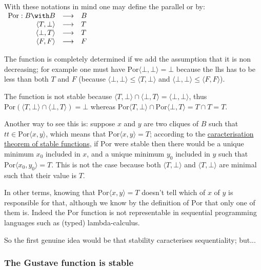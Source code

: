 With these notations in mind one may define the parallel or by:
\(\begin{array}{rcl}
\mathrm{Por} : B\with B & \longrightarrow&  B\\
  \langle T,\bot\rangle & \longrightarrow&  T\\
  \langle \bot,T\rangle & \longrightarrow&  T\\
    \langle F, F\rangle & \longrightarrow&  F
\end{array}\)

The function is completely determined if we add the assumption that it
is non decreasing; for example one must have
\(\mathrm{Por}\langle\bot,\bot\rangle = \bot\) because the lhs has to be
less than both \(T\) and \(F\) (because
\(\langle\bot,\bot\rangle \leq \langle T,\bot\rangle\) and
\(\langle\bot,\bot\rangle \leq \langle F,F\rangle\)).

The function is not stable because
\(\langle T,\bot\rangle \cap \langle \bot, T\rangle = \langle\bot, \bot\rangle\),
thus
\(\mathrm{Por}(\langle T,\bot\rangle \cap \langle \bot, T\rangle) = \bot\)
whereas
\(\mathrm{Por}\langle T,\bot\rangle \cap \mathrm{Por}\langle \bot, T\rangle = T\cap T = T\).

Another way to see this is: suppose \(x\) and \(y\) are two cliques of
\(B\) such that \(tt\in \mathrm{Por}\langle x, y\rangle\), which means
that \(\mathrm{Por}\langle x, y\rangle = T\); according to the
\hyperref[stable-functions]{caracterisation theorem of stable
functions}, if \(\mathrm{Por}\) were stable then there would be a unique
minimum \(x_0\) included in \(x\), and a unique minimum \(y_0\) included
in \(y\) such that \(\mathrm{Por}\langle x_0, y_0\rangle = T\). This is
not the case because both \(\langle T,\bot\rangle\) and
\(\langle T,\bot\rangle\) are minimal such that their value is \(T\).

In other terms, knowing that \(\mathrm{Por}\langle x, y\rangle = T\)
doesn't tell which of \(x\) of \(y\) is responsible for that, although
we know by the definition of \(\mathrm{Por}\) that only one of them is.
Indeed the \(\mathrm{Por}\) function is not representable in sequential
programming languages such as (typed) lambda-calculus.

So the first genuine idea would be that stability caracterises
sequentiality; but...

\subsubsection{The Gustave function is stable}\label{the-gustave-function-is-stable}

